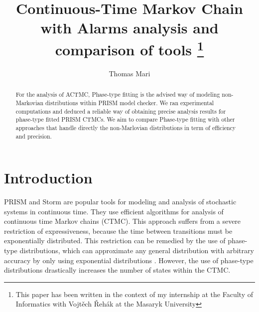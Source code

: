 \documentclass[runningheads,custombib]{llncs}
\begin{document}
%
\title{Continuous-Time Markov Chain with Alarms analysis and comparison of tools \thanks{This paper has been written in the context of my internship at the Faculty of Informatics with Vojt\v{e}ch \v{R}eh{\'{a}}k at the Masaryk University}}
%
%
\author{Thomas Mari}%
%
%
%
\maketitle              %
%
\begin{abstract}
For the analysis of ACTMC, Phase-type fitting is the advised way of modeling non-Markovian distributions within PRISM model checker. We ran experimental computations and deduced a reliable way of obtaining precise analysis results for phase-type fitted PRISM CTMCs.
We aim to compare Phase-type fitting with other approaches that handle directly the non-Marlovian distributions in term of efficiency and precision.


\end{abstract}
%
%
%
\section{Introduction}

	PRISM \cite{KNP11} and Storm \cite{DBLP:journals/corr/DehnertJK017} are popular tools for modeling and analysis of stochastic systems in continuous time. They use efficient algorithms for analysis of continuous time Markov chains (CTMC). This approach suffers from a severe restriction of expressiveness, because the time between transitions must be exponentially distributed. This restriction can be remedied by the use of phase-type distributions, which can approximate any general distribution with arbitrary accuracy by only using exponential distributions \cite{Buchholz:2014:IMP:2683922}. However, the use of phase-type distributions drastically increases the number of states within the CTMC.
	
\end{document}

